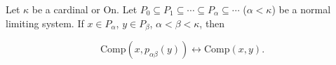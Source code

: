 Let $\kappa$ be a cardinal or $\mathrm{On}$. Let $P_0 \subseteq P_1 \subseteq \cdots \subseteq P_{\alpha} \subseteq \cdots$ ($\alpha < \kappa$) be a normal limiting system. If $x \in P_{\alpha}$, $y \in P_{\beta}$, $\alpha < \beta < \kappa$, then

$$\mathrm{Comp}(x, p_{\alpha\beta}(y)) \leftrightarrow \mathrm{Comp}(x, y).$$
